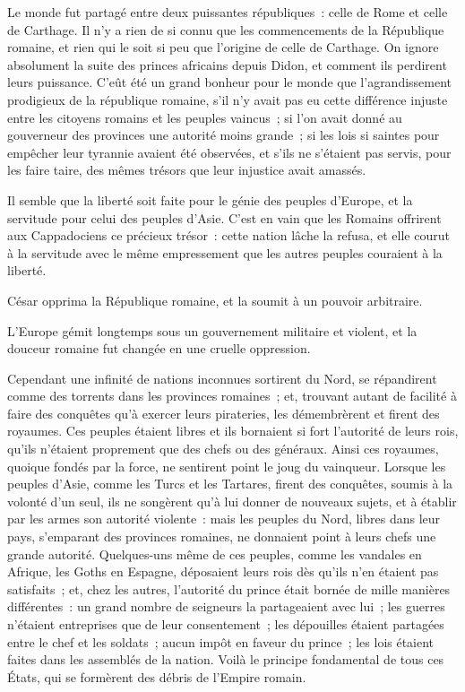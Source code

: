 \documentclass[french,twoside]{book} %
\begin{document}
Le monde fut partagé entre deux puissantes républiques : celle de Rome et celle de Carthage. Il n’y a rien de si connu que les commencements de la République romaine, et rien qui le soit si peu que l’origine de celle de Carthage. On ignore absolument la suite des princes africains depuis Didon, et comment ils perdirent leurs puissance. C’eût été un grand bonheur pour le monde que l’agrandissement prodigieux de la république romaine, s’il n’y avait pas eu cette différence injuste entre les citoyens romains et les peuples vaincus ; si l’on avait donné au gouverneur des provinces une autorité moins grande ; si les lois si saintes pour empêcher leur tyrannie avaient été observées, et s’ils ne s’étaient pas servis, pour les faire taire, des mêmes trésors que leur injustice avait amassés.\par
Il semble que la liberté soit faite pour le génie des peuples d’Europe, et la servitude pour celui des peuples d’Asie. C’est en vain que les Romains offrirent aux Cappadociens ce précieux trésor : cette nation lâche la refusa, et elle courut à la servitude avec le même empressement que les autres peuples couraient à la liberté.\par
César opprima la République romaine, et la soumit à un pouvoir arbitraire.\par
L’Europe gémit longtemps sous un gouvernement militaire et violent, et la douceur romaine fut changée en une cruelle oppression.\par
Cependant une infinité de nations inconnues sortirent du Nord, se répandirent comme des torrents dans les provinces romaines ; et, trouvant autant de facilité à faire des conquêtes qu’à exercer leurs pirateries, les démembrèrent et firent des royaumes. Ces peuples étaient libres et ils bornaient si fort l’autorité de leurs rois, qu’ils n’étaient proprement que des chefs ou des généraux. Ainsi ces royaumes, quoique fondés par la force, ne sentirent point le joug du vainqueur. Lorsque les peuples d’Asie, comme les Turcs et les Tartares, firent des conquêtes, soumis à la volonté d’un seul, ils ne songèrent qu’à lui donner de nouveaux sujets, et à établir par les armes son autorité violente : mais les peuples du Nord, libres dans leur pays, s’emparant des provinces romaines, ne donnaient point à leurs chefs une grande autorité. Quelques-uns même de ces peuples, comme les vandales en Afrique, les Goths en Espagne, déposaient leurs rois dès qu’ils n’en étaient pas satisfaits ; et, chez les autres, l’autorité du prince était bornée de mille manières différentes : un grand nombre de seigneurs la partageaient avec lui ; les guerres n’étaient entreprises que de leur consentement ; les dépouilles étaient partagées entre le chef et les soldats ; aucun impôt en faveur du prince ; les lois étaient faites dans les assemblés de la nation. Voilà le principe fondamental de tous ces États, qui se formèrent des débris de l’Empire romain.\par
\end{document}
